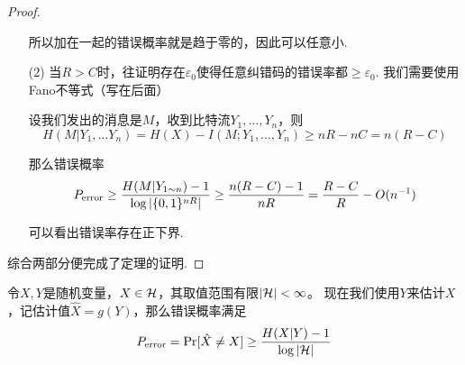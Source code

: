 \begin{proof}
\begin{enumerate}
        所以加在一起的错误概率就是趋于零的，因此可以任意小. 

        \item[(2)] 当$R > C$时，往证明存在$\varepsilon_0$使得任意纠错码的错误率都$\ge \varepsilon_0$. 我们需要使用Fano不等式（写在后面）
        
        设我们发出的消息是$M$，收到比特流$Y_1,\dots, Y_n$，则 
        \[
        H(M|Y_1,\dots Y_n) = H(X) - I(M;Y_1,\dots, Y_n) \ge nR - nC = n(R-C)
        \] 

        那么错误概率
        \[
        P_{\text{error}} \ge \dfrac{H(M|Y_{1\sim n}) - 1}{\log \left\vert\{0,1\}^{nR}\right\vert} \ge \dfrac{n(R-C) - 1}{nR} = \dfrac{R-C}{R} - O(n^{-1})
        \]

        可以看出错误率存在正下界. 
    \end{enumerate}

    综合两部分便完成了定理的证明.
\end{proof}

\begin{theorem}[Fano不等式]
    令$X,Y$是随机变量，$X \in \cal{H}$，其取值范围有限$\left\vert\cal{H}\right\vert < \infty$。 现在我们使用$Y$来估计$X$，记估计值$\hat{X} = g(Y)$，那么错误概率满足 
    \[
    P_{\text{error}} = \Pr[\hat{X} \neq X] \ge \dfrac{H(X|Y) - 1}{\log \left\vert\cal{H}\right\vert}
    \]
\end{theorem}
